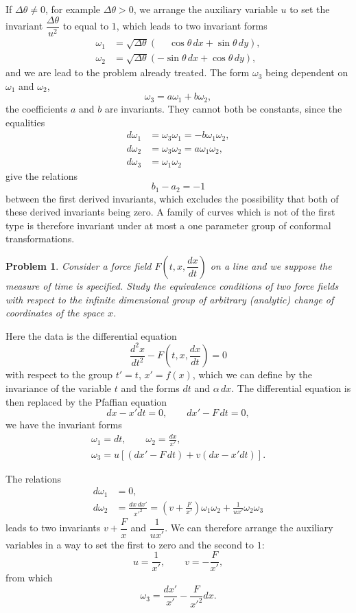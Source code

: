 \documentclass[leqno,11pt]{article}
\theoremstyle{shape1}
\newtheorem{prob}[thm]{Problem}
\theoremstyle{shape0}
\theoremstyle{shape2}
\theoremstyle{definition}
\begin{document}
If $\Delta\theta\neq 0$, for example $\Delta\theta>0$, we arrange the auxiliary variable $u$ to set the invariant $\dfrac{\Delta\theta}{u^{2}}$ to equal to $1$, which leads to two invariant forms
\begin{align*}
  \omega_{1}&=\sqrt{\Delta\theta}(\phantom{+}\cos\theta\,dx+\sin\theta\,dy),\\
  \omega_{2}&=\sqrt{\Delta\theta}(-\sin\theta\,dx+\cos\theta\,dy),  
\end{align*}
and we are lead to the problem already treated. The form $\omega_{3}$ being dependent on $\omega_{1}$ and $\omega_{2}$, 
\[
\omega_{3}=a\omega_{1}+b\omega_{2},
\]
the coefficients $a$ and $b$ are invariants. They cannot both be constants, since the equalities
\begin{align*}
  d\omega_{1}&=\omega_{3}\omega_{1}=-b\omega_{1}\omega_{2},\\
  d\omega_{2}&=\omega_{3}\omega_{2}=a\omega_{1}\omega_{2},\\
  d\omega_{3}&=\omega_{1}\omega_{2}
\end{align*}
give the relations
\[
b_{1}-a_{2}=-1
\]
between the first derived invariants, which excludes the possibility that both of these derived invariants being zero. A family of curves which is not of the first type is therefore invariant under at most a one parameter group of conformal transformations.

\begin{prob}
  Consider a force field $F\left(t,x,\dfrac{dx}{dt}\right)$ on a line and we suppose the measure of time is specified. Study the equivalence conditions of two force fields with respect to the infinite dimensional group of arbitrary (analytic) change of coordinates of the space $x$.
\end{prob}

Here the data is the differential equation
\[
\frac{d^{2}x}{dt^{2}}-F\left(t,x,\frac{dx}{dt}\right)=0
\]
with respect to the group $t'=t$, $x'=f(x)$, which we can define by the invariance of the variable $t$ and the forms $dt$ and $\alpha\,dx$. The differential equation is then replaced by the Pfaffian equation
\[
dx-x'dt=0,\qquad dx'-F\,dt=0,
\]
we have the invariant forms
\begin{gather*}
  \omega_{1}=dt,\qquad\omega_{2}=\frac{dx}{x'},\\
  \omega_{3}=u[(dx'-F\,dt)+v(dx-x'dt)].
\end{gather*}

The relations
\begin{align*}
  d\omega_{1}&=0,\\
  d\omega_{2}&=\frac{dx\,dx'}{x'^{2}}=\left(v+\frac{F}{x'}\right)\omega_{1}\omega_{2}+\frac{1}{ux'}\omega_{2}\omega_{3}
\end{align*}
leads to two invariants $v+\dfrac{F}{x}$ and $\dfrac{1}{ux'}$. We can therefore arrange the auxiliary variables in a way to set the first to zero and the second to $1$:
\[
u=\frac{1}{x'},\qquad v=-\frac{F}{x'},
\]
from which
\[
\omega_{3}=\frac{dx'}{x'}-\frac{F}{x'^{2}}dx.
\]
\end{document}
